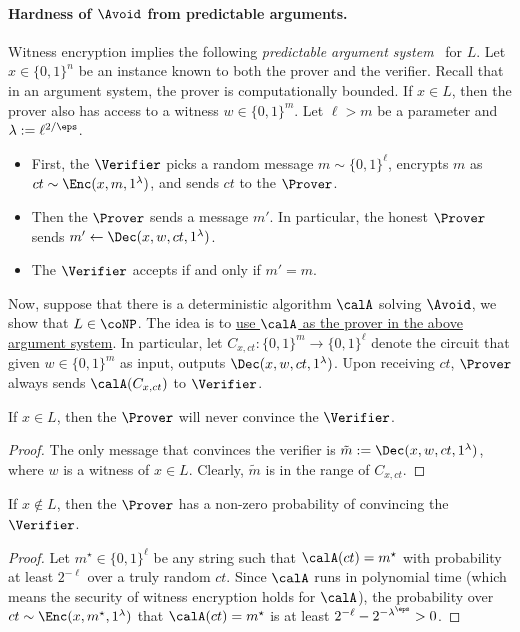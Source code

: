 \paragraph{Hardness of $\Avoid$ from predictable arguments.} Witness encryption implies the following \emph{predictable argument system}~\cite{DBLP:conf/pkc/FaonioN017} for $L$. Let $x\in \{0, 1\}^n$ be an instance known to both the prover and the verifier. Recall that in an argument system, the prover is computationally bounded. If $x\in L$, then the prover also has access to a witness $w \in \{0, 1\}^m$. Let $\ell > m$ be a parameter and $\lambda := \ell^{2/\eps}$.
\begin{itemize}
	\item First, the $\Verifier$ picks a random message $m\sim \{0, 1\}^\ell$, encrypts $m$ as $ct \sim \Enc(x, m, 1^\lambda)$, and sends $ct$ to the $\Prover$.
	\item Then the $\Prover$ sends a message $m'$. In particular, the honest $\Prover$ sends $m' \gets \Dec(x, w, ct, 1^\lambda)$.
	\item The $\Verifier$ accepts if and only if $m' = m$.
\end{itemize}

Now, suppose that there is a deterministic algorithm $\calA$ solving $\Avoid$, we show that $L \in \coNP$. The idea is to \underline{use $\calA$ as the prover in the above argument system}. In particular, let $C_{x, ct}: \{0, 1\}^m \to \{0, 1\}^\ell$ denote the circuit that given $w\in \{0, 1\}^m$ as input, outputs $\Dec(x, w, ct, 1^\lambda)$. Upon receiving $ct$, $\Prover$ always sends $\calA(C_{x, ct})$ to $\Verifier$.

\begin{claim}
	If $x\in L$, then the $\Prover$ will never convince the $\Verifier$.
\end{claim}
\begin{proof}
	The only message that convinces the verifier is $\tilde{m} := \Dec(x, w, ct, 1^\lambda)$, where $w$ is a witness of $x\in L$. Clearly, $\tilde{m}$ is in the range of $C_{x, ct}$.
\end{proof}

\begin{claim}
	If $x\not\in L$, then the $\Prover$ has a non-zero probability of convincing the $\Verifier$.
\end{claim}
\begin{proof}
	Let $m^\star \in \{0, 1\}^\ell$ be any string such that $\calA(ct) = m^\star$ with probability at least $2^{-\ell}$ over a truly random $ct$. Since $\calA$ runs in polynomial time (which means the security of witness encryption holds for $\calA$), the probability over $ct \sim \Enc(x, m^\star, 1^\lambda)$ that $\calA(ct) = m^\star$ is at least $2^{-\ell} - 2^{-\lambda^\eps} > 0$. 
\end{proof}

